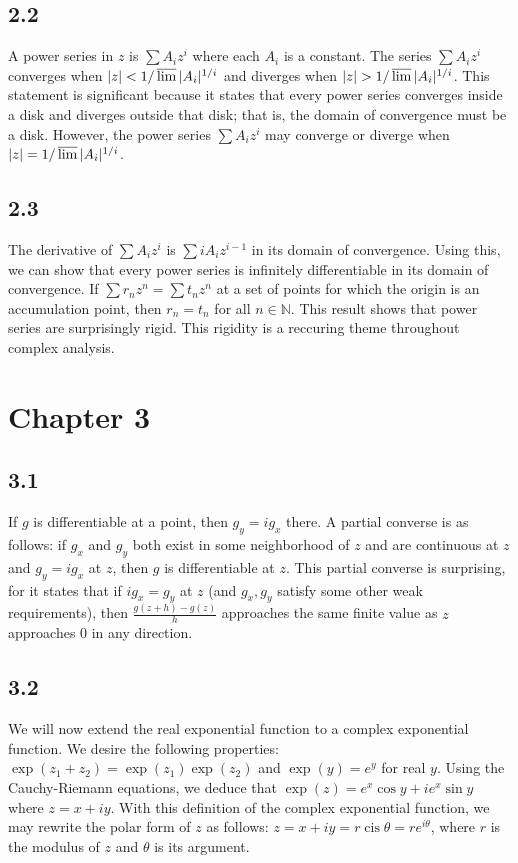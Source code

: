 \documentclass[12pt]{article}
\newcommand{\nn}{\mathbb N}
\DeclareMathOperator{\cis}{cis}
\begin{document}
\subsection*{2.2}
A power series in $z$ is $\sum A_i z^i$ where each $A_i$ is a constant. The series $\sum A_i z^i$ converges when $\vert z \vert < 1/\varlimsup{\vert A_i \vert^{1/i}}$ and diverges when $\vert z \vert > 1/\varlimsup{\vert A_i \vert^{1/i}}$. This statement is significant because it states that every power series converges inside a disk and diverges outside that disk; that is, the domain of convergence must be a disk. However, the power series $\sum A_i z^i$ may converge or diverge when $\vert z\vert = 1/\varlimsup{\vert A_i \vert^{1/i}}$.
\subsection*{2.3}
The derivative of $\sum A_i z^i$ is $\sum i A_i z^{i-1}$ in its domain of convergence. Using this, we can show that every power series is infinitely differentiable in its domain of convergence. If $\sum r_n z^n = \sum t_n z^n$ at a set of points for which the origin is an accumulation point, then $r_n = t_n$ for all $n\in \nn$. This result shows that power series are surprisingly rigid. This rigidity is a reccuring theme throughout complex analysis.
\section*{Chapter 3}
\subsection*{3.1} If $g$ is differentiable at a point, then $g_y = ig_x$ there. A partial converse is as follows: if $g_x$ and $g_y$ both exist in some neighborhood of $z$ and are continuous at $z$ and $g_y = ig_x$ at $z$, then $g$ is differentiable at $z$. This partial converse is surprising, for it states that if $ig_x = g_y$ at $z$ (and $g_x,g_y$ satisfy some other weak requirements), then $\frac{g(z+h)-g(z)}{h}$ approaches the same finite value as $z$ approaches $0$ in any direction.
\subsection*{3.2}
We will now extend the real exponential function to a complex exponential function. We desire the following properties: \(\exp(z_1+z_2) = \exp(z_1)\exp(z_2)\) and
\(\exp(y) = e^y\) for real $y$. Using the Cauchy-Riemann equations, we deduce that \(\exp(z) = e^x \cos y + i e^x \sin y\) where $z = x + iy$. With this definition of the complex exponential function, we may rewrite the polar form of $z$ as follows: $z = x+iy = r\cis \theta = re^{i\theta}$, where $r$ is the modulus of $z$ and $\theta$ is its argument. 
\end{document}
